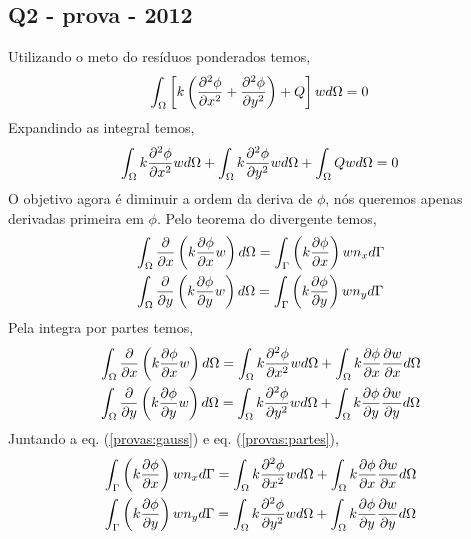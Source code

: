 \subsection{Q2 - prova - 2012}

Utilizando o meto do resíduos ponderados temos,
%
\begin{equation}
	\int_{\Omega} \left[k \left(\frac{\partial^2 \phi}{\partial x^2} + \frac{\partial^2 \phi}{\partial y^2}\right) + Q\right]w d\Omega = 0	
\end{equation}
%
Expandindo as integral temos,
%
\begin{equation}
	\int_{\Omega} k \frac{\partial^2 \phi}{\partial x^2} w d\Omega + \int_{\Omega} k \frac{\partial^2 \phi}{\partial y^2} w d\Omega + \int_{\Omega} Q w d\Omega = 0
	\label{provas:passo_intermediario}
\end{equation}
%
O objetivo agora é diminuir a ordem da deriva de $\phi$, nós queremos apenas derivadas primeira em $\phi$. Pelo teorema do divergente temos,
%
\begin{equation}
	\begin{split}
	&\int_{\Omega} \frac{\partial }{\partial x} \left( k \frac{\partial \phi}{\partial x} w \right) d\Omega = \int_{\Gamma} \left(k \frac{\partial \phi}{\partial x}\right) w n_x d\Gamma\\
	&\int_{\Omega} \frac{\partial }{\partial y} \left( k \frac{\partial \phi}{\partial y} w \right) d\Omega = \int_{\Gamma} \left(k \frac{\partial \phi}{\partial y}\right) w n_y d\Gamma
    \end{split}
	\label{provas:gauss}
\end{equation}
%
Pela integra por partes temos,
%
\begin{equation}
	\begin{split}
	&\int_{\Omega} \frac{\partial }{\partial x} \left( k \frac{\partial \phi}{\partial x} w \right) d\Omega = \int_{\Omega} k \frac{\partial^2 \phi}{\partial x^2} w d\Omega + \int_{\Omega} k \frac{\partial \phi}{\partial x} \frac{\partial w}{\partial x}  d\Omega\\
	&\int_{\Omega} \frac{\partial }{\partial y} \left( k \frac{\partial \phi}{\partial y} w \right) d\Omega = \int_{\Omega} k \frac{\partial^2 \phi}{\partial y^2} w d\Omega + \int_{\Omega} k \frac{\partial \phi}{\partial y} \frac{\partial w}{\partial y}  d\Omega\\
	\end{split}
	\label{provas:partes}
\end{equation}
%
Juntando a eq. (\ref{provas:gauss}) e eq. (\ref{provas:partes}),
%
\begin{equation}
	\begin{split}
		&\int_{\Gamma} \left(k \frac{\partial \phi}{\partial x}\right) w n_x d\Gamma = \int_{\Omega} k \frac{\partial^2 \phi}{\partial x^2} w d\Omega + \int_{\Omega} k \frac{\partial \phi}{\partial x} \frac{\partial w}{\partial x}  d\Omega\\
		&\int_{\Gamma} \left(k \frac{\partial \phi}{\partial y}\right) w n_y d\Gamma = \int_{\Omega} k \frac{\partial^2 \phi}{\partial y^2} w d\Omega + \int_{\Omega} k \frac{\partial \phi}{\partial y} \frac{\partial w}{\partial y}  d\Omega\\
	\end{split}
\end{equation}
